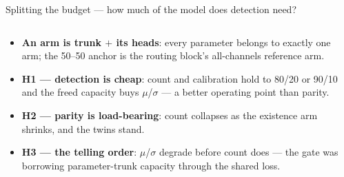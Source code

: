 \begin{frame}{Splitting the budget --- how much of the model does detection need?}
\begin{columns}[c]
\begin{column}{0.43\textwidth}
\begin{itemize}
              trunks); ladders keep four levels, only width moves, and every
              realized split sits within $0.01$ points of its label.
        \item \textbf{An arm is trunk $+$ its heads}: every parameter belongs
              to exactly one arm; the 50--50 anchor is the routing block's
              all-channels reference arm.
        \item \textbf{H1 --- detection is cheap}: count and calibration hold
              to 80/20 or 90/10 and the freed capacity buys $\mu$/$\sigma$
              --- a better operating point than parity.
        \item \textbf{H2 --- parity is load-bearing}: count collapses as the
              existence arm shrinks, and the twins stand.
        \item \textbf{H3 --- the telling order}: $\mu$/$\sigma$ degrade before
              count does --- the gate was borrowing parameter-trunk capacity
              through the shared loss.
      \end{itemize}
    \end{column}
  \end{columns}
\end{frame}


